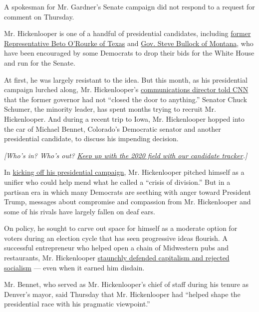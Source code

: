 A spokesman for Mr. Gardner's Senate campaign did not respond to a
request for comment on Thursday.

Mr. Hickenlooper is one of a handful of presidential candidates,
including
\href{https://www.nytimes.com/2019/08/15/us/politics/beto-orourke-2020-trump.html}{former
Representative Beto O'Rourke of Texas} and
\href{https://www.nytimes.com/2019/06/26/us/politics/steve-bullock-democrats-2020.html}{Gov.
Steve Bullock of Montana}, who have been encouraged by some Democrats to
drop their bids for the White House and run for the Senate.

At first, he was largely resistant to the idea. But this month, as his
presidential campaign lurched along, Mr. Hickenlooper's
\href{https://www.cnn.com/2019/08/06/politics/hickenlooper-schumer-senate-2020/index.html}{communications
director told CNN} that the former governor had not ``closed the door to
anything.'' Senator Chuck Schumer, the minority leader, has spent months
trying to recruit Mr. Hickenlooper. And during a recent trip to Iowa,
Mr. Hickenlooper hopped into the car of Michael Bennet, Colorado's
Democratic senator and another presidential candidate, to discuss his
impending decision.

\emph{{[}Who's in? Who's out?}
\href{https://www.nytimes.com/interactive/2019/us/politics/2020-presidential-candidates.html?action=click\&module=inline\&pgtype=Article}{\emph{Keep
up with the 2020 field with our candidate tracker}}\emph{.{]}}

In
\href{https://www.nytimes.com/2019/03/04/us/john-hickenlooper-2020.html}{kicking
off his presidential campaign}, Mr. Hickenlooper pitched himself as a
unifier who could help mend what he called a ``crisis of division.'' But
in a partisan era in which many Democrats are seething with anger toward
President Trump, messages about compromise and compassion from Mr.
Hickenlooper and some of his rivals have largely fallen on deaf ears.

On policy, he sought to carve out space for himself as a moderate option
for voters during an election cycle that has seen progressive ideas
flourish. A successful entrepreneur who helped open a chain of
Midwestern pubs and restaurants, Mr. Hickenlooper
\href{https://www.nytimes.com/2019/06/27/us/politics/john-hickenlooper-capitalism-socialism.html}{staunchly
defended capitalism and rejected socialism} --- even when it earned him
disdain.

Mr. Bennet, who served as Mr. Hickenlooper's chief of staff during his
tenure as Denver's mayor, said Thursday that Mr. Hickenlooper had
``helped shape the presidential race with his pragmatic viewpoint.''


